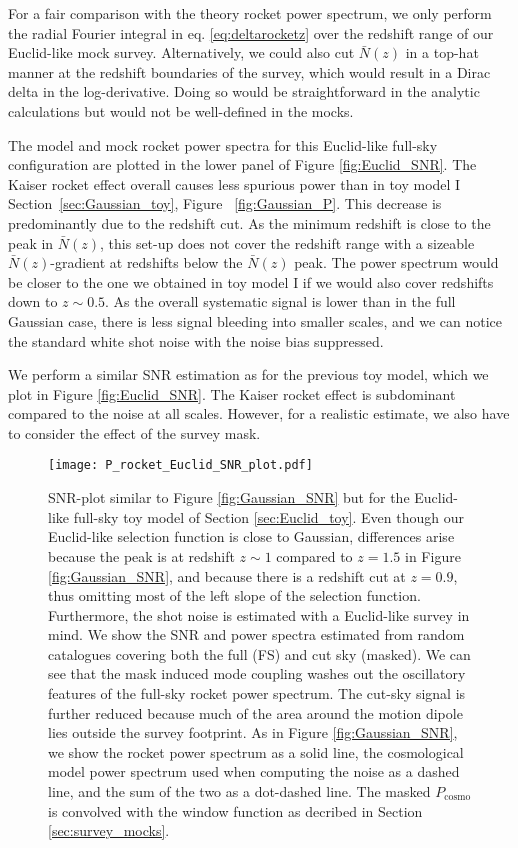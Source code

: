 \documentclass[a4paper,11pt]{article}
\begin{document}
For a fair comparison with the theory rocket power spectrum, we only perform the radial Fourier integral in eq. \eqref{eq:deltarocketz} over the redshift range of our Euclid-like mock survey. Alternatively, we could also cut $\bar N(z)$ in a top-hat manner at the redshift boundaries of the survey, which would result in a Dirac delta in the log-derivative. Doing so would be straightforward in the analytic calculations but would not be well-defined in the mocks.

The model and mock rocket power spectra for this Euclid-like full-sky configuration are plotted in the lower panel of Figure \ref{fig:Euclid_SNR}. The Kaiser rocket effect overall causes less spurious power than in toy model I Section~\ref{sec:Gaussian_toy}, Figure ~\ref{fig:Gaussian_P}. This decrease is predominantly due to the redshift cut. As the minimum redshift is close to the peak in $\bar N(z)$, this set-up does not cover the redshift range with a sizeable $\bar N(z)$-gradient at redshifts below the $\bar N(z)$ peak. The power spectrum would be closer to the one we obtained in toy model I  if we would also cover redshifts down to $z\sim 0.5$. As the overall systematic signal is lower than in the full Gaussian case, there is less signal bleeding into smaller scales, and we can notice the standard white shot noise with the noise bias suppressed.

We perform a similar  SNR estimation as for the previous toy model, which we plot in Figure \ref{fig:Euclid_SNR}.  The Kaiser rocket effect is subdominant compared to the noise at all scales. However, for a realistic estimate, we also have to consider the effect of the survey mask.

\begin{figure}
    \centering
    \texttt{[image: P\_rocket\_Euclid\_SNR\_plot.pdf]}
    \caption{SNR-plot similar to Figure \ref{fig:Gaussian_SNR} but for the Euclid-like full-sky toy model of Section \ref{sec:Euclid_toy}. Even though our Euclid-like selection function is close to Gaussian, differences arise because the peak is at redshift $z\sim 1$ compared to $z = 1.5$ in Figure \ref{fig:Gaussian_SNR}, and because there is a redshift cut at $z = 0.9$, thus omitting most of the left slope of the selection function. Furthermore, the shot noise is estimated with a Euclid-like survey in mind. We show the SNR and power spectra estimated from random catalogues covering both the full (FS) and cut sky (masked). We can see that the mask induced mode coupling washes out the oscillatory features of the full-sky rocket power spectrum. The cut-sky signal is further reduced because much of the area around the motion dipole lies outside the survey footprint. As in Figure \ref{fig:Gaussian_SNR}, we show the rocket power spectrum as a solid line, the cosmological model power 
    spectrum used when computing the noise as a dashed line, and the sum of the two as a dot-dashed line. The masked $P_\mathrm{cosmo}$ is convolved with the window function as decribed in Section \ref{sec:survey_mocks}.}
    \label{fig:Euclid_SNR}
    \label{fig:P_rocket_Euclid_FS_vs_masked}
\end{figure}
\end{document}

